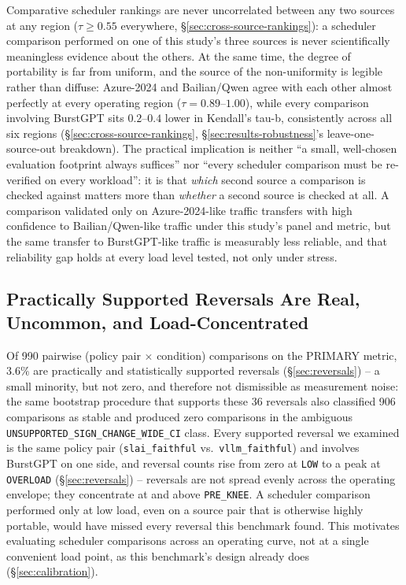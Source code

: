 \documentclass[sn-basic,Numbered,pdflatex]{sn-jnl}
\begin{document}
Comparative scheduler rankings are never uncorrelated between any two
sources at any region ($\tau \geq 0.55$ everywhere,
\S\ref{sec:cross-source-rankings}): a scheduler comparison performed on
one of this study's three sources is never scientifically meaningless
evidence about the others. At the same time, the degree of portability is
far from uniform, and the source of the non-uniformity is legible rather
than diffuse: Azure-2024 and Bailian/Qwen agree with each other almost
perfectly at every operating region ($\tau = 0.89$--$1.00$), while every
comparison involving BurstGPT sits $0.2$--$0.4$ lower in Kendall's tau-b,
consistently across all six regions (\S\ref{sec:cross-source-rankings},
\S\ref{sec:results-robustness}'s leave-one-source-out breakdown). The
practical implication is neither ``a small, well-chosen evaluation
footprint always suffices'' nor ``every scheduler comparison must be
re-verified on every workload'': it is that \emph{which} second source a
comparison is checked against matters more than \emph{whether} a second
source is checked at all. A comparison validated only on Azure-2024-like
traffic transfers with high confidence to Bailian/Qwen-like traffic under
this study's panel and metric, but the same transfer to BurstGPT-like
traffic is measurably less reliable, and that reliability gap holds at
every load level tested, not only under stress.

\subsection{Practically Supported Reversals Are Real, Uncommon, and
Load-Concentrated}

Of 990 pairwise (policy pair $\times$ condition) comparisons on the
PRIMARY metric, $3.6\%$ are practically and statistically supported
reversals (\S\ref{sec:reversals}) -- a small minority, but not zero, and
therefore not dismissible as measurement noise: the same bootstrap
procedure that supports these 36 reversals also classified 906 comparisons
as stable and produced zero comparisons in the ambiguous
\texttt{UNSUPPORTED\_SIGN\_CHANGE\_WIDE\_CI} class. Every supported
reversal we examined is the same policy pair
(\texttt{slai\_faithful} vs.\ \texttt{vllm\_faithful}) and involves
BurstGPT on one side, and reversal counts rise from zero at \texttt{LOW}
to a peak at \texttt{OVERLOAD} (\S\ref{sec:reversals}) -- reversals are not
spread evenly across the operating envelope; they concentrate at and above
\texttt{PRE\_KNEE}. A scheduler comparison performed only at low load,
even on a source pair that is otherwise highly portable, would have missed
every reversal this benchmark found. This motivates evaluating scheduler
comparisons across an operating curve, not at a single convenient load
point, as this benchmark's design already does
(\S\ref{sec:calibration}).
\end{document}
